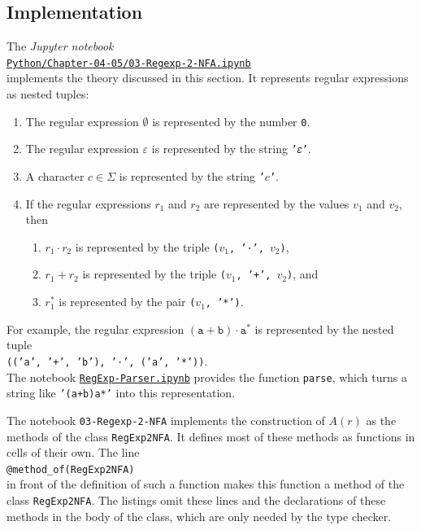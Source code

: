 \subsection{Implementation}
The \textsl{Jupyter notebook} 
\\[0.2cm]
\hspace*{1.3cm}
\href{https://github.com/karlstroetmann/Formal-Languages/blob/master/Python/Chapter-04-05/03-Regexp-2-NFA.ipynb}{\texttt{Python/Chapter-04-05/03-Regexp-2-NFA.ipynb}} 
\\[0.2cm]
implements the theory discussed in this section.  It represents regular expressions as nested tuples:
\begin{enumerate}
\item The regular expression $\emptyset$ is represented by the number \texttt{0}.
\item The regular expression $\varepsilon$ is represented by the string \texttt{'𝜀'}.
\item A character $c \in \Sigma$ is represented by the string \texttt{'$c$'}.
\item If the regular expressions $r_1$ and $r_2$ are represented by the values $v_1$ and $v_2$, then
      \begin{enumerate}
      \item $r_1 \cdot r_2$ is represented by the triple \texttt{(}$v_1$\texttt{, '⋅', }$v_2$\texttt{)},
      \item $r_1 + r_2$ is represented by the triple \texttt{(}$v_1$\texttt{, '+', }$v_2$\texttt{)}, and
      \item $r_1^*$ is represented by the pair \texttt{(}$v_1$\texttt{, '*')}.
      \end{enumerate}
\end{enumerate}
For example, the regular expression $(\texttt{a} + \texttt{b}) \cdot \texttt{a}^*$ is represented by the nested
tuple
\\[0.2cm]
\hspace*{1.3cm}
\texttt{(('a', '+', 'b'), '⋅', ('a', '*'))}.
\\[0.2cm]
The notebook
\href{https://github.com/karlstroetmann/Formal-Languages/blob/master/Python/Chapter-04-05/RegExp-Parser.ipynb}{\texttt{RegExp-Parser.ipynb}}
provides the function \texttt{parse}, which turns a string like \texttt{'(a+b)a*'} into this representation.

The notebook \texttt{03-Regexp-2-NFA} implements the construction of $A(r)$ as the methods of the class
\texttt{RegExp2NFA}.  It defines most of these methods as functions in cells of their own.  The line
\\[0.2cm]
\hspace*{1.3cm}
\texttt{@method\_of(RegExp2NFA)}
\\[0.2cm]
in front of the definition of such a function makes this function a method of the class \texttt{RegExp2NFA}.
The listings omit these lines and the declarations of these methods in the body of the class, which are only
needed by the type checker.


